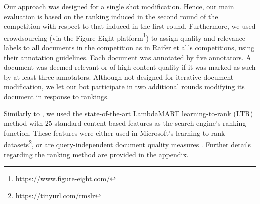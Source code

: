   Our approach was designed for a single shot modification. Hence, our
  main evaluation is based on the ranking induced in the second round
  of the competition with respect to that induced in the first round. Furthermore, we used crowdsourcing
  (via the Figure Eight platform\footnote{\url{https://www.figure-eight.com/}})
  to assign quality and relevance labels to all documents in the competition as in Raifer
  et al.'s competitions, using their annotation guidelines. Each document was annotated by five
  annotators. A document was deemed relevant or of high content quality if it was marked as such by at least three annotators. Although not designed for iterative document modification, we
  let our bot participate in two additional rounds modifying its document in response to rankings.


Similarly to \citet{Raifer+al:17a}, we used the state-of-the-art LambdaMART learning-to-rank (LTR) method
\cite{Wu+al:10a} with $25$ standard content-based features as the search engine's ranking function. These features were either used in Microsoft's learning-to-rank datasets\footnote{\url{https://tinyurl.com/rmslr}}, or are query-independent document
quality measures \cite{Bendersky+al:11a}. Further details regarding the ranking method are provided in the appendix. 




